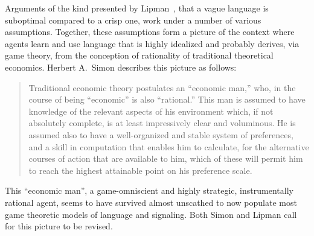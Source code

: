 \documentclass[a4paper]{article}
\begin{document}
Arguments of the kind presented by Lipman~\parencite*{lipman_why_2009}, that a vague language is suboptimal compared to a crisp one, work under a number of various assumptions.
Together, these assumptions form a picture of the context where agents learn and use language that is highly idealized and probably derives, via game theory, from the conception of rationality of traditional theoretical economics.
Herbert A.~Simon describes this picture as follows:
\begin{quote}
Traditional economic theory postulates an ``economic man,'' who, in the course of being ``economic'' is also ``rational.''
This man is assumed to have knowledge of the relevant aspects of his environment which, if not absolutely complete, is at least impressively clear and voluminous.
He is assumed also to have a well-organized and stable system of preferences, and a skill in computation that enables him to calculate, for the alternative courses of action that are available to him, which of these will permit him to reach the highest attainable point on his preference scale.%
~\parencite[99]{simon_behavioral_1955}
\end{quote}
This ``economic man'', a game-omniscient and highly strategic, instrumentally rational agent, seems to have survived almost unscathed to now populate most game theoretic models of language and signaling.
Both Simon and Lipman call for this picture to be revised.
\end{document}
